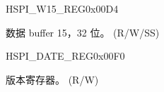 \begin{register}{H}{SPI\_W15\_REG}{0x{}00D4}\label{regdesc:SPIW15REG}
%
\regnewline%
\begin{regdesc}\begin{reglist}
\label{fielddesc:SPIBUF15}\item [SPI\_BUF15] 数据 buffer 15，32 位。 (R/W/SS)
\end{reglist}\end{regdesc}
\end{register}


\begin{register}{H}{SPI\_DATE\_REG}{0x{}00F0}\label{regdesc:SPIDATEREG}
%
%
\regnewline%
\begin{regdesc}\begin{reglist}
\label{fielddesc:SPIDATE}\item [SPI\_DATE] 版本寄存器。 (R/W)
\end{reglist}\end{regdesc}
\end{register}



